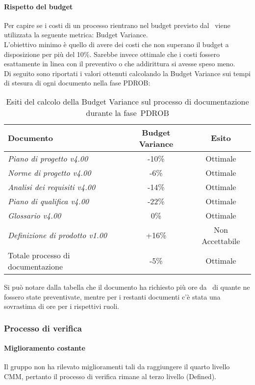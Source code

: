 \documentclass[../PianoDiQualifica.tex]{subfiles}
\begin{document}
\begin{appendices}
			\paragraph{Rispetto del budget}
			Per capire se i costi di un processo rientrano nel budget previsto dal \pianodiprogetto\ viene utilizzata la seguente metrica: Budget Variance.\\
			L'obiettivo minimo è quello di avere dei costi che non superano il budget a disposizione per più del 10\%. Sarebbe invece ottimale che i costi fossero esattamente in linea con il preventivo o che addirittura si avesse speso meno.\\
			Di seguito sono riportati i valori ottenuti calcolando la Budget Variance sui tempi di stesura di ogni documento nella fase PDROB:
			\begin{table}[H]
				\centering
				\begin{tabular}{l * {2}{c}}
					\toprule
					\textbf{Documento} & \textbf{Budget Variance} & \textbf{Esito} \\
					\midrule
					\textit{Piano di progetto v4.00} & -10\% &  Ottimale \\
					\textit{Norme di progetto v4.00} & -6\% & Ottimale \\
					\textit{Analisi dei requisiti v4.00} & -14\% & Ottimale \\
					\textit{Piano di qualifica v4.00} & -22\% & Ottimale \\
					\textit{Glossario v4.00} & 0\% & Ottimale \\
					\textit{Definizione di prodotto v1.00} & +16\% & Non Accettabile \\
					Totale processo di documentazione & -5\% & Ottimale \\
					\bottomrule
				\end{tabular}
				\caption{Esiti del calcolo della Budget Variance sul processo di documentazione durante la fase\g\ PDROB}
				Si può notare dalla tabella che il documento \specificatecnica ha richiesto più ore da \progettista\ di quante ne fossero state preventivate, mentre per i restanti documenti c'è stata una sovrastima di ore per i rispettivi ruoli.
				\label{tab:esiti_budget_variance}
			\end{table}
			 
						
		\subsubsection{Processo di verifica}
			\paragraph{Miglioramento costante}
			Il gruppo non ha rilevato miglioramenti tali da raggiungere il quarto livello CMM, pertanto il processo di verifica rimane al terzo livello (Defined).
			

\end{appendices}
\end{document}
